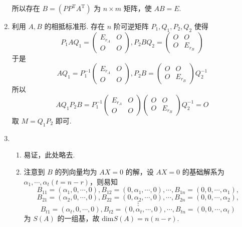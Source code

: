 \begin{enumerate}
    所以存在 $B=(PP^{\mathrm{T}}A^{\mathrm{T}})$ 为 $n\times m$ 矩阵，使 $AB=E$.
    \item 利用 $A,B$ 的相抵标准形. 存在 $n$ 阶可逆矩阵 $P_1,Q_1,P_2,Q_2$ 使得
    \[P_1AQ_1=\begin{pmatrix}E_{r_A} & O \\ O & O\end{pmatrix},P_2BQ_2=\begin{pmatrix}O & O \\ O & E_{r_B}\end{pmatrix}\]
    于是 \[AQ_1=P_1^{-1}\begin{pmatrix}E_{r_A} & O \\ O & O\end{pmatrix},P_2B=\begin{pmatrix}O & O \\ O & E_{r_B}\end{pmatrix}Q_2^{-1}\]
    所以 \[AQ_1P_2B=P_1^{-1}\begin{pmatrix}E_{r_A} & O \\ O & O\end{pmatrix}\begin{pmatrix}O & O \\ O & E_{r_B}\end{pmatrix}Q_2^{-1}=O\]
    取 $M=Q_1P_2$ 即可.
    \item \begin{enumerate}
        \item 易证，此处略去.
        \item 注意到 $B$ 的列向量均为 $AX=0$ 的解，设 $AX=0$ 的基础解系为 $\alpha_1,\cdots,\alpha_t(t=n-r)$，则易知
        \[B_{11}=(\alpha_1,0,\cdots,0),B_{12}=(0,\alpha_1,\cdots,0),\cdots,B_{1n}=(0,0,\cdots,\alpha_1),\]
        \[B_{21}=(\alpha_2,0,\cdots,0),B_{22}=(0,\alpha_2,\cdots,0),\cdots,B_{2n}=(0,0,\cdots,\alpha_2),\]
        \[\vdots\]
        \[B_{t1}=(\alpha_t,0,\cdots,0),B_{t2}=(0,\alpha_t,\cdots,0),\cdots,B_{tn}=(0,0,\cdots,\alpha_t)\]
        为 $S(A)$ 的一组基，故 $\mathrm{dim}S(A)=n(n-r)$.
    \end{enumerate}
\end{enumerate}

